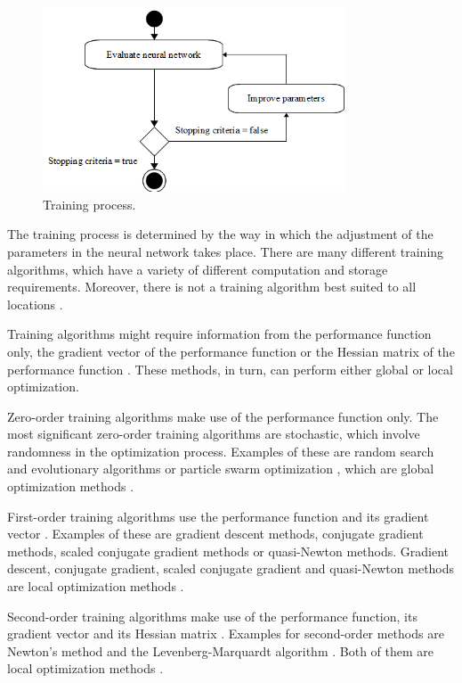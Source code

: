 \begin{figure}[h!]
\begin{center}
\includegraphics[width=0.8\textwidth]{training_strategy/training_process.png}
\caption{Training process.}\label{TrainingProcess}
\end{center}
\end{figure}

The training process is determined by the way in which the
adjustment of the parameters in the neural network takes place.
There are many different training algorithms, which have a variety
of different computation and storage requirements. Moreover, there
is not a training algorithm best suited to all locations
\cite{Wolpert1997}.

Training algorithms might require information from the performance
function only, the gradient vector of the performance function or the
Hessian matrix of the performance function \cite{Press2002}. These
methods, in turn, can perform either global or local optimization.

Zero-order training algorithms make use of the performance function
only. The most significant zero-order
training algorithms are stochastic, which involve randomness in the
optimization process. Examples of these are random
search and evolutionary
algorithms \cite{Goldberg1988}
\cite{Fogel1994} or particle swarm optimization \cite{Kennedy1995},
which are global optimization methods .

First-order training algorithms use the performance function and its
gradient vector \cite{Battiti1992}.
Examples of these are gradient descent methods, conjugate gradient methods, scaled conjugate gradient methods \cite{Moller1993} or quasi-Newton
methods. Gradient descent, conjugate
gradient, scaled conjugate gradient and quasi-Newton methods are
local optimization methods \cite{Luenberger1984}.

Second-order training algorithms make use of the performance function,
its gradient vector and its Hessian matrix \cite{Battiti1992}. Examples for second-order methods are
Newton's method and the Levenberg-Marquardt
algorithm \cite{Hagan1994}.
Both of them are local optimization methods \cite{Luenberger1984}.

